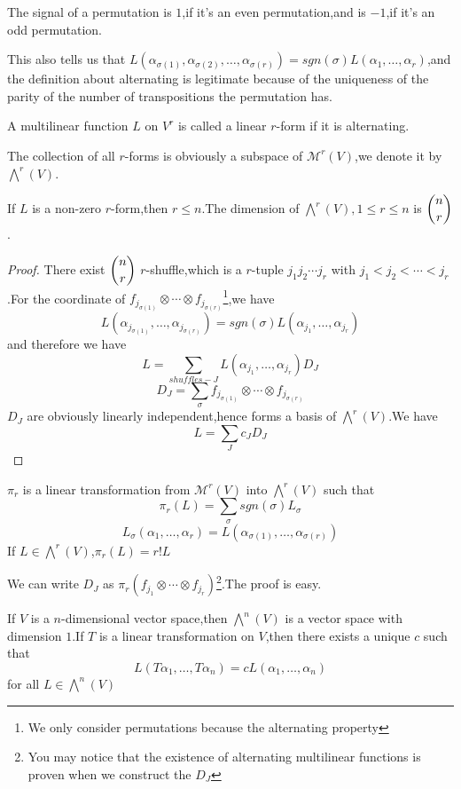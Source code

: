 \documentclass{article}
\begin{document}
\begin{dde}
	The signal of a permutation is $1$,if it's an even permutation,and is $-1$,if it's an odd permutation.
\end{dde}
This also tells us that $L(\alpha_{\sigma(1)},\alpha_{\sigma(2)},\dots,\alpha_{\sigma(r)})=sgn(\sigma)L(\alpha_1,\dots,\alpha_r)$,and the definition about alternating is legitimate because of the uniqueness of the parity of the number of transpositions the permutation has.\\
\begin{dde}
	A multilinear function $L$ on $V^r$ is called a linear $r$-form if it is alternating.
\end{dde}
The collection of all $r$-forms is obviously a subspace of $\mathcal{M}^r(V)$,we denote it by $\bigwedge^r(V)$.
\begin{thm}
	If $L$ is a non-zero $r$-form,then $r\le n$.The dimension of $\bigwedge^r(V),1\le r\le n$ is $\dbinom{n}{r}$.
\end{thm}
\begin{proof}
	There exist $\dbinom{n}{r}$ $r$-shuffle,which is a $r$-tuple $j_1j_2\cdots j_r$ with $j_1<j_2<\cdots<j_r$.For the coordinate of $f_{j_{\sigma(1)}}\otimes\cdots\otimes f_{j_{\sigma(r)}}$\footnote{We only consider permutations because the alternating property},we have
	\[L(\alpha_{j_{\sigma(1)}},\dots,\alpha_{j_{\sigma(r)}})=sgn(\sigma)L(\alpha_{j_1},\dots,\alpha_{j_r})\]
	and therefore we have
	\[L=\sum\limits_{shuffles-J}L(\alpha_{j_1},\dots,\alpha_{j_r})D_J\]
	\[D_J=\sum\limits_\sigma f_{j_{\sigma(1)}}\otimes\cdots\otimes f_{j_{\sigma(r)}}\]
	$D_J$ are obviously linearly independent,hence forms a basis of $\bigwedge^r(V)$.We have
	\[L=\sum\limits_Jc_JD_J\]
\end{proof}
\begin{dde}
	$\pi_r$ is a linear transformation from $\mathcal{M}^r(V)$ into $\bigwedge^r(V)$ such that
	\[\pi_r(L)=\sum\limits_\sigma sgn(\sigma)L_\sigma\]
	\[L_\sigma(\alpha_1,\dots,\alpha_r)=L(\alpha_{\sigma(1)},\dots,\alpha_{\sigma(r)})\]
	If $L\in\bigwedge^r(V)$,$\pi_r(L)=r!L$
\end{dde}
We can write $D_J$ as $\pi_r(f_{j_1}\otimes\cdots\otimes f_{j_r})$\footnote{You may notice that the existence of alternating multilinear functions is proven when we construct the $D_J$}.The proof is easy.
\begin{coro}
	If $V$ is a $n$-dimensional vector space,then $\bigwedge^n(V)$ is a vector space with dimension $1$.If $T$ is a linear transformation on $V$,then there exists a unique $c$ such that
	\[L(T\alpha_1,\dots,T\alpha_n)=cL(\alpha_1,\dots,\alpha_n)\]
	for all $L\in\bigwedge^n(V)$
\end{coro}
\end{document}
